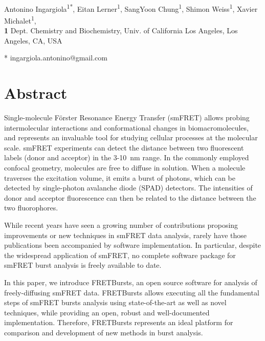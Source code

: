 \documentclass[10pt,letterpaper]{article}
\date{}
\begin{document}
\vspace*{0.35in}

\begin{flushleft}
{\Large
\textbf\newline{}
}
\newline
\\
Antonino Ingargiola\textsuperscript{1*},
Eitan Lerner\textsuperscript{1},
SangYoon Chung\textsuperscript{1},
Shimon Weiss\textsuperscript{1},
Xavier Michalet\textsuperscript{1},
\\
\bigskip
\textbf{1} Dept. Chemistry and Biochemistry, Univ. of California Los Angeles, Los Angeles, CA, USA
\bigskip

* ingargiola.antonino@gmail.com
\end{flushleft}


\section*{Abstract}
Single-molecule Förster Resonance Energy Transfer (smFRET) allows
probing intermolecular interactions and conformational changes in
biomacromolecules, and represents an invaluable tool for studying
cellular processes at the molecular scale. smFRET experiments can
detect the distance between two fluorescent labels (donor and acceptor)
in the 3-10~nm range. In the commonly employed confocal geometry,
molecules are free to diffuse in solution. When a molecule traverses
the excitation volume, it emits a burst of photons, which can be detected
by single-photon avalanche diode (SPAD) detectors. The intensities of
donor and acceptor fluorescence can then be related to the distance
between the two fluorophores.

While recent years have seen a growing number of contributions
proposing improvements or new techniques in smFRET data analysis,
rarely have those publications been accompanied by software implementation.
In particular, despite the widespread application of smFRET, no complete
software package for smFRET burst analysis is freely available to date.

In this paper, we introduce FRETBursts, an open source software
for analysis of freely-diffusing smFRET data.
FRETBursts allows executing all the fundamental steps of smFRET bursts
analysis using state-of-the-art as well as novel techniques,
while providing an open, robust and well-documented implementation.
Therefore, FRETBursts represents an ideal platform for comparison
and development of new methods in burst analysis.
\end{document}
